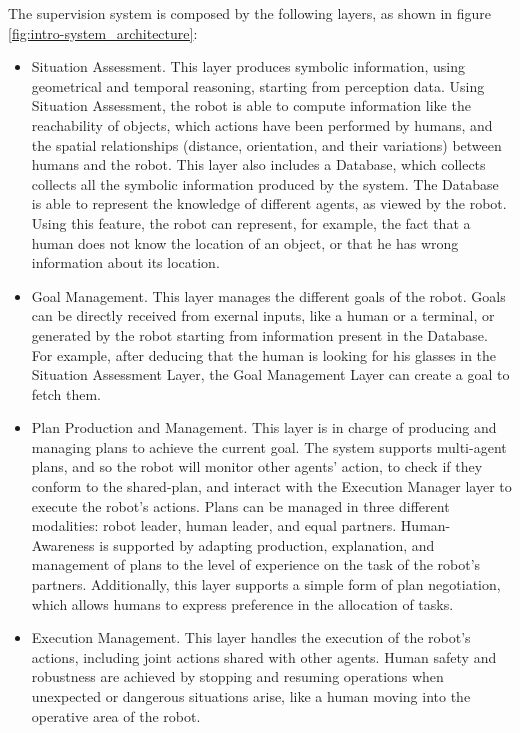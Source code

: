 The supervision system is composed by the following layers, as shown in figure \ref{fig:intro-system_architecture}:
\begin{itemize}
\item Situation Assessment. This layer produces symbolic information, using geometrical and temporal reasoning, starting from perception data. Using Situation Assessment, the robot is able to compute information like the reachability of objects, which actions have been performed by humans, and the spatial relationships (distance, orientation, and their variations) between humans and the robot. This layer also includes a Database, which collects collects all the symbolic information produced by the system. The Database is able to represent the knowledge of different agents, as viewed by the robot. Using this feature, the robot can represent, for example, the fact that a human does not know the location of an object, or that he has wrong information about its location.
\item Goal Management. This layer manages the different goals of the robot. Goals can be directly received from exernal inputs, like a human or a terminal, or generated by the robot starting from information present in the Database. For example, after deducing that the human is looking for his glasses in the Situation Assessment Layer, the Goal Management Layer can create a goal to fetch them. 
\item Plan Production and Management. This layer is in charge of producing and managing plans to achieve the current goal. The system supports multi-agent plans, and so the robot will monitor other agents' action, to check if they conform to the shared-plan, and interact with the Execution Manager layer to execute the robot's actions. Plans can be managed in three different modalities: robot leader, human leader, and equal partners. Human-Awareness is supported by adapting  production, explanation, and management of plans to the level of experience on the task of the robot's partners. Additionally, this layer supports a simple form of plan negotiation, which allows humans to express preference in the allocation of tasks.
\item Execution Management. This layer handles the execution of the robot's actions, including joint actions shared with other agents. Human safety and robustness are achieved by stopping and resuming operations  when unexpected or dangerous situations arise, like a human moving into the operative area of the robot.
\end{itemize}

